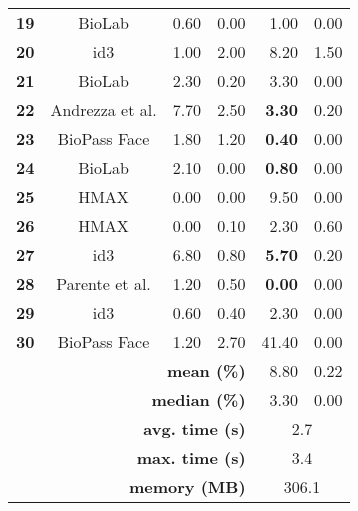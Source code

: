 \begin{table}[tb]
\begin{tabular}{ccrrrr}
\textbf{19} & BioLab & 0.60 & {\color[HTML]{9B9B9B} 0.00} & 1.00 & {\color[HTML]{9B9B9B} 0.00} \\
\textbf{20} & id3 & 1.00 & {\color[HTML]{9B9B9B} 2.00} & 8.20 & {\color[HTML]{9B9B9B} 1.50} \\
\textbf{21} & BioLab & 2.30 & {\color[HTML]{9B9B9B} 0.20} & 3.30 & {\color[HTML]{9B9B9B} 0.00} \\
\textbf{22} & Andrezza et al. & 7.70 & {\color[HTML]{9B9B9B} 2.50} & \textbf{3.30} & {\color[HTML]{9B9B9B} 0.20} \\
\textbf{23} & BioPass Face & 1.80 & {\color[HTML]{9B9B9B} 1.20} & \textbf{0.40} & {\color[HTML]{9B9B9B} 0.00} \\
\textbf{24} & BioLab & 2.10 & {\color[HTML]{9B9B9B} 0.00} & \textbf{0.80} & {\color[HTML]{9B9B9B} 0.00} \\
\textbf{25} & HMAX & 0.00 & {\color[HTML]{9B9B9B} 0.00} & 9.50 & {\color[HTML]{9B9B9B} 0.00} \\
\textbf{26} & HMAX & 0.00 & {\color[HTML]{9B9B9B} 0.10} & 2.30 & {\color[HTML]{9B9B9B} 0.60} \\
\textbf{27} & id3 & 6.80 & {\color[HTML]{9B9B9B} 0.80} & \textbf{5.70} & {\color[HTML]{9B9B9B} 0.20} \\
\textbf{28} & Parente et al. & 1.20 & {\color[HTML]{9B9B9B} 0.50} & \textbf{0.00} & {\color[HTML]{9B9B9B} 0.00} \\
\textbf{29} & id3 & 0.60 & {\color[HTML]{9B9B9B} 0.40} & 2.30 & {\color[HTML]{9B9B9B} 0.00} \\
\textbf{30} & BioPass Face & 1.20 & {\color[HTML]{9B9B9B} 2.70} & 41.40 & {\color[HTML]{9B9B9B} 0.00} \\ \hline
\multicolumn{4}{r}{\textbf{mean (\%)}} & 8.80 & 0.22 \\
\multicolumn{4}{r}{\textbf{median (\%)}} & 3.30 & 0.00 \\
\multicolumn{4}{r}{\textbf{avg. time (s)}} & \multicolumn{2}{c}{2.7} \\
\multicolumn{4}{r}{\textbf{max. time (s)}} & \multicolumn{2}{c}{3.4} \\
\multicolumn{4}{r}{\textbf{memory (MB)}} & \multicolumn{2}{c}{306.1}
\end{tabular}
\end{table}